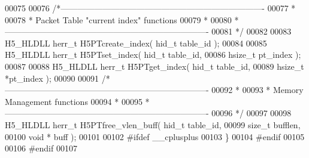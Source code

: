 \begin{DoxyCode}
00075 
00076 \textcolor{comment}{/*-------------------------------------------------------------------------}
00077 \textcolor{comment}{ *}
00078 \textcolor{comment}{ * Packet Table "current index" functions}
00079 \textcolor{comment}{ *}
00080 \textcolor{comment}{ *-------------------------------------------------------------------------}
00081 \textcolor{comment}{ */}
00082 
00083 H5\_HLDLL herr\_t  H5PTcreate\_index( hid\_t table\_id );
00084 
00085 H5\_HLDLL herr\_t  H5PTset\_index( hid\_t table\_id,
00086                              hsize\_t pt\_index );
00087 
00088 H5\_HLDLL herr\_t  H5PTget\_index( hid\_t table\_id,
00089                              hsize\_t *pt\_index );
00090 
00091 \textcolor{comment}{/*-------------------------------------------------------------------------}
00092 \textcolor{comment}{ *}
00093 \textcolor{comment}{ * Memory Management functions}
00094 \textcolor{comment}{ *}
00095 \textcolor{comment}{ *-------------------------------------------------------------------------}
00096 \textcolor{comment}{ */}
00097 
00098 H5\_HLDLL herr\_t  H5PTfree\_vlen\_buff( hid\_t table\_id,
00099                                \textcolor{keywordtype}{size\_t} bufflen,
00100                                \textcolor{keywordtype}{void} * buff );
00101 
00102 \textcolor{preprocessor}{#ifdef \_\_cplusplus}
00103 \}
00104 \textcolor{preprocessor}{#endif}
00105 
00106 \textcolor{preprocessor}{#endif}
00107 
\end{DoxyCode}
